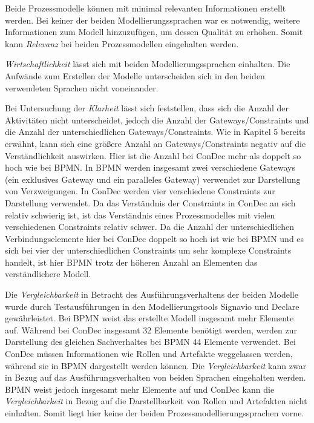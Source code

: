 Beide Prozessmodelle können mit minimal relevanten Informationen erstellt werden. Bei keiner der beiden Modellierungssprachen war es notwendig, weitere Informationen zum Modell hinzuzufügen, um dessen Qualität zu erhöhen. Somit kann \textit{Relevanz} bei beiden Prozessmodellen eingehalten werden.\newline


\textit{Wirtschaftlichkeit} lässt sich mit beiden Modellierungssprachen einhalten. Die Aufwände zum Erstellen der Modelle unterscheiden sich in den beiden verwendeten Sprachen nicht voneinander.\newline

Bei Untersuchung der \textit{Klarheit} lässt sich feststellen, dass sich die Anzahl der Aktivitäten nicht unterscheidet, jedoch die Anzahl der Gateways/Constraints und die Anzahl der unterschiedlichen Gateways/Constraints. Wie in Kapitel 5 bereits erwähnt, kann sich eine größere Anzahl an Gateways/Constraints negativ auf die Verständlichkeit auswirken. Hier ist die Anzahl bei ConDec mehr als doppelt so hoch wie bei BPMN. In BPMN werden insgesamt zwei verschiedene Gateways (ein exklusives Gateway und ein paralleles Gateway) verwendet zur Darstellung von Verzweigungen. In ConDec werden vier verschiedene Constraints zur Darstellung verwendet. Da das Verständnis der Constraints in ConDec an sich relativ schwierig ist, ist das Verständnis eines Prozessmodelles mit vielen verschiedenen Constraints relativ schwer. Da die Anzahl der unterschiedlichen Verbindungselemente hier bei ConDec doppelt so hoch ist wie bei BPMN und es sich bei vier der unterschiedlichen Constraints um sehr komplexe Constraints handelt, ist hier BPMN trotz der höheren Anzahl an Elementen das verständlichere Modell.
\newline

Die \textit{Vergleichbarkeit} in Betracht des Ausführungsverhaltens der beiden Modelle wurde durch Testausführungen in den Modellierungstools Signavio und Declare gewährleistet.\newline
Bei BPMN weist das erstellte Modell insgesamt mehr Elemente auf. Während bei ConDec insgesamt 32 Elemente benötigt werden, werden zur Darstellung des gleichen Sachverhaltes bei BPMN 44 Elemente verwendet. \newline
Bei ConDec müssen Informationen wie Rollen und Artefakte weggelassen werden, während sie in BPMN dargestellt werden können.\newline
Die \textit{Vergleichbarkeit} kann zwar in Bezug auf das Ausführungsverhalten von beiden Sprachen eingehalten werden. BPMN weist jedoch insgesamt mehr Elemente auf und ConDec kann die \textit{Vergleichbarkeit} in Bezug auf die Darstellbarkeit von Rollen und Artefakten nicht einhalten. Somit liegt hier keine der beiden Prozessmodellierungssprachen vorne.\newline

